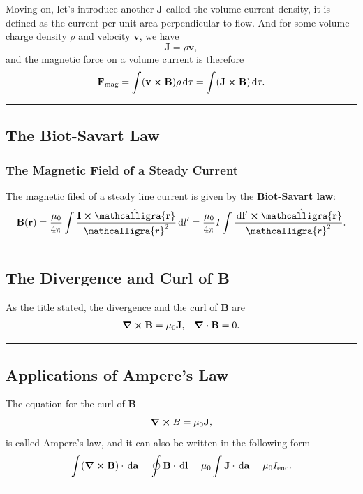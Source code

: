 \documentclass[12pt,english]{article}
\newcommand{\dmr}[1]{\, \mathrm{d}#1} %
\numberwithin{equation}{subsection}
\newcommand{\curly}[1]{\ensuremath{\mathcalligra{#1}}}
\let\oldhat\hat
\renewcommand{\vec}[1]{\mathbf{#1}}
\renewcommand{\hat}[1]{\oldhat{\mathbf{#1}}}
\begin{document}
Moving on, let's introduce another $\vec{J}$ called the volume current density, it is defined as the current per unit area-perpendicular-to-flow. And for some volume charge density $\rho$ and velocity $\vec{v}$, we have
\begin{equation}
    \vec{J} = \rho \vec{v},
\end{equation}
and the magnetic force on a volume current is therefore
\begin{equation}
    \vec{F}_{\text{mag}} = \int (\vec{v}\cross\vec{B})\rho \dmr{\tau} = \int (\vec{J}\cross \vec{B})\dmr{\tau}.
\end{equation}
\par\noindent\rule{\textwidth}{0.4pt}
\subsection{The Biot-Savart Law}
\subsubsection{The Magnetic Field of a Steady Current}
The magnetic filed of a steady line current is given by the \textbf{Biot-Savart law}:
\begin{equation}
    \vec{B}(\vec{r}) = \frac{\mu_0}{4\pi}\int\frac{\vec{I}\cross\hat{\curly{r}}}{\curly{r}^2}\dmr{l'} = \frac{\mu_0}{4\pi}I\int \frac{\dmr{\vec{l'}}\cross\hat{\curly{r}}}{\curly{r}^2}.
\end{equation}
\par\noindent\rule{\textwidth}{0.4pt}

\subsection{The Divergence and Curl of B}
As the title stated, the divergence and the curl of $\vec{B}$ are
\begin{align*}
    \curl\vec{B} = \mu_0 \vec{J}, && \divergence \vec{B} =0.
\end{align*}


\par\noindent\rule{\textwidth}{0.4pt}
\subsection{Applications of Ampere's Law}
The equation for the curl of $\vec{B}$
\begin{equation}
    \curl B = \mu_0 \vec{J},
\end{equation}
is called Ampere's law, and it can also be written in the following form
\begin{equation}
    \int(\curl\vec{B})\cdot\dmr{\vec{a}} = \oint \vec{B} \cdot \dmr{\vec{l}} = \mu_0 \int \vec{J} \cdot \dmr{\vec{a}} = \mu_0 I_{\text{enc}}.
\end{equation}
\par\noindent\rule{\textwidth}{0.4pt}
\end{document}
